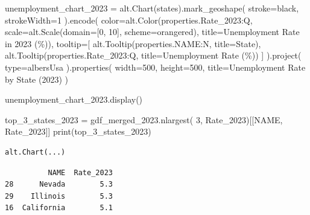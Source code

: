 \documentclass[
  letterpaper,
  DIV=11,
  numbers=noendperiod]{scrartcl}
\newenvironment{Shaded}{\begin{snugshade}}{\end{snugshade}}
\newcommand{\BuiltInTok}[1]{\textcolor[rgb]{0.00,0.23,0.31}{#1}}
\newcommand{\DecValTok}[1]{\textcolor[rgb]{0.68,0.00,0.00}{#1}}
\newcommand{\NormalTok}[1]{\textcolor[rgb]{0.00,0.23,0.31}{#1}}
\newcommand{\OperatorTok}[1]{\textcolor[rgb]{0.37,0.37,0.37}{#1}}
\newcommand{\StringTok}[1]{\textcolor[rgb]{0.13,0.47,0.30}{#1}}
\begin{document}
\begin{Shaded}
\begin{Highlighting}[]
\NormalTok{unemployment\_chart\_2023 }\OperatorTok{=}\NormalTok{ alt.Chart(states).mark\_geoshape(}
\NormalTok{    stroke}\OperatorTok{=}\StringTok{\textquotesingle{}black\textquotesingle{}}\NormalTok{,}
\NormalTok{    strokeWidth}\OperatorTok{=}\DecValTok{1}
\NormalTok{).encode(}
\NormalTok{    color}\OperatorTok{=}\NormalTok{alt.Color(}\StringTok{\textquotesingle{}properties.Rate\_2023:Q\textquotesingle{}}\NormalTok{,}
\NormalTok{                    scale}\OperatorTok{=}\NormalTok{alt.Scale(domain}\OperatorTok{=}\NormalTok{[}\DecValTok{0}\NormalTok{, }\DecValTok{10}\NormalTok{], scheme}\OperatorTok{=}\StringTok{\textquotesingle{}orangered\textquotesingle{}}\NormalTok{),}
\NormalTok{                    title}\OperatorTok{=}\StringTok{\textquotesingle{}Unemployment Rate in 2023 (\%)\textquotesingle{}}\NormalTok{),}
\NormalTok{    tooltip}\OperatorTok{=}\NormalTok{[}
\NormalTok{        alt.Tooltip(}\StringTok{\textquotesingle{}properties.NAME:N\textquotesingle{}}\NormalTok{, title}\OperatorTok{=}\StringTok{\textquotesingle{}State\textquotesingle{}}\NormalTok{),}
\NormalTok{        alt.Tooltip(}\StringTok{\textquotesingle{}properties.Rate\_2023:Q\textquotesingle{}}\NormalTok{, title}\OperatorTok{=}\StringTok{\textquotesingle{}Unemployment Rate (\%)\textquotesingle{}}\NormalTok{)}
\NormalTok{    ]}
\NormalTok{).project(}
    \BuiltInTok{type}\OperatorTok{=}\StringTok{\textquotesingle{}albersUsa\textquotesingle{}}
\NormalTok{).properties(}
\NormalTok{    width}\OperatorTok{=}\DecValTok{500}\NormalTok{,}
\NormalTok{    height}\OperatorTok{=}\DecValTok{500}\NormalTok{,}
\NormalTok{    title}\OperatorTok{=}\StringTok{\textquotesingle{}Unemployment Rate by State (2023)\textquotesingle{}}
\NormalTok{)}

\NormalTok{unemployment\_chart\_2023.display()}

\NormalTok{top\_3\_states\_2023 }\OperatorTok{=}\NormalTok{ gdf\_merged\_2023.nlargest(}
    \DecValTok{3}\NormalTok{, }\StringTok{\textquotesingle{}Rate\_2023\textquotesingle{}}\NormalTok{)[[}\StringTok{\textquotesingle{}NAME\textquotesingle{}}\NormalTok{, }\StringTok{\textquotesingle{}Rate\_2023\textquotesingle{}}\NormalTok{]]}
\BuiltInTok{print}\NormalTok{(top\_3\_states\_2023)}
\end{Highlighting}
\end{Shaded}

\begin{verbatim}
alt.Chart(...)
\end{verbatim}

\begin{verbatim}
          NAME  Rate_2023
28      Nevada        5.3
29    Illinois        5.3
16  California        5.1
\end{verbatim}
\end{document}
